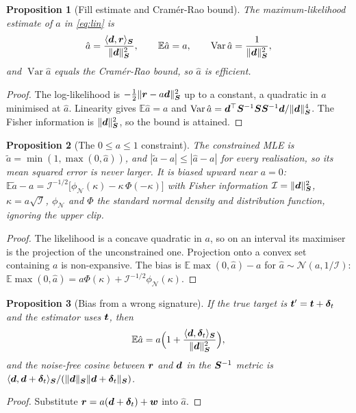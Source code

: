 \documentclass[11pt,a4paper]{article}
\theoremstyle{plain}
\newtheorem{proposition}{Proposition}[section]
\theoremstyle{definition}
\theoremstyle{remark}
\newcommand{\E}{\mathbb{E}}
\newcommand{\Var}{\operatorname{Var}}
\newcommand{\tv}{\B{t}}
\newcommand{\rv}{\B{r}}
\newcommand{\dv}{\B{d}}
\newcommand{\Sm}{\B{S}}
\newcommand{\ip}[2]{\langle #1,#2\rangle_{\Sm}}
\newcommand{\nrm}[1]{\lVert #1\rVert}
\begin{document}
\begin{proposition}[Fill estimate and Cram\'er-Rao bound]
\label{prop:fill}
The maximum-likelihood estimate of $a$ in \eqref{eq:lin} is
\[
  \hat a=\frac{\ip{\dv}{\rv}}{\nrm{\dv}_{\Sm}^2},\qquad \E\hat a=a,\qquad
  \Var\hat a=\frac{1}{\nrm{\dv}_{\Sm}^2},
\]
and $\Var\hat a$ equals the Cram\'er-Rao bound, so $\hat a$ is efficient.
\end{proposition}
\begin{proof}
The log-likelihood is $-\tfrac12\nrm{\rv-a\dv}_{\Sm}^2$ up to a constant, a quadratic in $a$ minimised at
$\hat a$. Linearity gives $\E\hat a=a$ and $\Var\hat a=\dv^\top\Sm^{-1}\Sm\Sm^{-1}\dv/\nrm{\dv}^4_{\Sm}$. The Fisher
information is $\nrm{\dv}_{\Sm}^2$, so the bound is attained.
\end{proof}

\begin{proposition}[The $0\le a\le1$ constraint]
\label{prop:clip}
The constrained MLE is $\tilde a=\min(1,\max(0,\hat a))$, and $|\tilde a-a|\le|\hat a-a|$ for every realisation,
so its mean squared error is never larger. It is biased upward near $a=0$:
$\E\tilde a-a=\mathcal I^{-1/2}\big[\phi_{\mathcal N}(\kappa)-\kappa\,\Phi(-\kappa)\big]$ with Fisher information
$\mathcal I=\nrm{\dv}^2_{\Sm}$, $\kappa=a\sqrt{\mathcal I}$, $\phi_{\mathcal N}$ and $\Phi$ the standard normal density and
distribution function, ignoring the upper clip.
\end{proposition}
\begin{proof}
The likelihood is a concave quadratic in $a$, so on an interval its maximiser is the projection of the
unconstrained one. Projection onto a convex set containing $a$ is non-expansive. The bias is $\E\max(0,\hat a)-a$
for $\hat a\sim\mathcal N(a,1/\mathcal I)$: $\E\max(0,\hat a)=a\Phi(\kappa)+\mathcal I^{-1/2}\phi_{\mathcal N}(\kappa)$.
\end{proof}

\begin{proposition}[Bias from a wrong signature]
\label{prop:mismatch}
If the true target is $\tv'=\tv+\B\delta_t$ and the estimator uses $\tv$, then
\[
  \E\hat a = a\Big(1+\frac{\ip{\dv}{\B\delta_t}}{\nrm{\dv}^2_{\Sm}}\Big),
\]
and the noise-free cosine between $\rv$ and $\dv$ in the $\Sm^{-1}$ metric is
$\ip{\dv}{\dv+\B\delta_t}/(\nrm{\dv}_{\Sm}\nrm{\dv+\B\delta_t}_{\Sm})$.
\end{proposition}
\begin{proof}
Substitute $\rv=a(\dv+\B\delta_t)+\B w$ into $\hat a$.
\end{proof}
\end{document}

